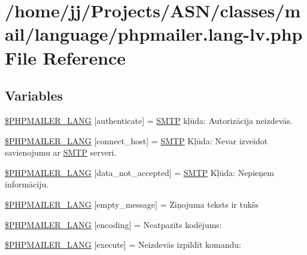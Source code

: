\hypertarget{phpmailer_8lang-lv_8php}{}\section{/home/jj/\+Projects/\+A\+S\+N/classes/mail/language/phpmailer.lang-\/lv.php File Reference}
\label{phpmailer_8lang-lv_8php}
\subsection*{Variables}
\begin{DoxyCompactItemize}
\item 
\hyperlink{phpmailer_8lang-lv_8php_a2cb33073c989b85580748e331ed8b4aa}{\$\+P\+H\+P\+M\+A\+I\+L\+E\+R\+\_\+\+L\+A\+NG} \mbox{[}\textquotesingle{}authenticate\textquotesingle{}\mbox{]} = \textquotesingle{}\hyperlink{class_s_m_t_p}{S\+M\+TP} kļūda\+: Autorizācija neizdevās.\textquotesingle{}
\item 
\hyperlink{phpmailer_8lang-lv_8php_a2ee0cc637a06b96e45600db31c6799ee}{\$\+P\+H\+P\+M\+A\+I\+L\+E\+R\+\_\+\+L\+A\+NG} \mbox{[}\textquotesingle{}connect\+\_\+host\textquotesingle{}\mbox{]} = \textquotesingle{}\hyperlink{class_s_m_t_p}{S\+M\+TP} Kļūda\+: Nevar izveidot savienojumu ar \hyperlink{class_s_m_t_p}{S\+M\+TP} serveri.\textquotesingle{}
\item 
\hyperlink{phpmailer_8lang-lv_8php_a814c6b191205d2361b3233e9c9d6fda5}{\$\+P\+H\+P\+M\+A\+I\+L\+E\+R\+\_\+\+L\+A\+NG} \mbox{[}\textquotesingle{}data\+\_\+not\+\_\+accepted\textquotesingle{}\mbox{]} = \textquotesingle{}\hyperlink{class_s_m_t_p}{S\+M\+TP} Kļūda\+: Nepieņem informāciju.\textquotesingle{}
\item 
\hyperlink{phpmailer_8lang-lv_8php_a33772099f637c9d6c2cd7425e0e37fed}{\$\+P\+H\+P\+M\+A\+I\+L\+E\+R\+\_\+\+L\+A\+NG} \mbox{[}\textquotesingle{}empty\+\_\+message\textquotesingle{}\mbox{]} = \textquotesingle{}Ziņojuma teksts ir tukšs\textquotesingle{}
\item 
\hyperlink{phpmailer_8lang-lv_8php_a817f7283f3d54c970a0c10305cc668cc}{\$\+P\+H\+P\+M\+A\+I\+L\+E\+R\+\_\+\+L\+A\+NG} \mbox{[}\textquotesingle{}encoding\textquotesingle{}\mbox{]} = \textquotesingle{}Neatpazīts kodējums\+: \textquotesingle{}
\item 
\hyperlink{phpmailer_8lang-lv_8php_a668217a9563a168f30f2a8548b6ed5a9}{\$\+P\+H\+P\+M\+A\+I\+L\+E\+R\+\_\+\+L\+A\+NG} \mbox{[}\textquotesingle{}execute\textquotesingle{}\mbox{]} = \textquotesingle{}Neizdevās izpildīt komandu\+: \textquotesingle{}

\end{DoxyCompactItemize}
